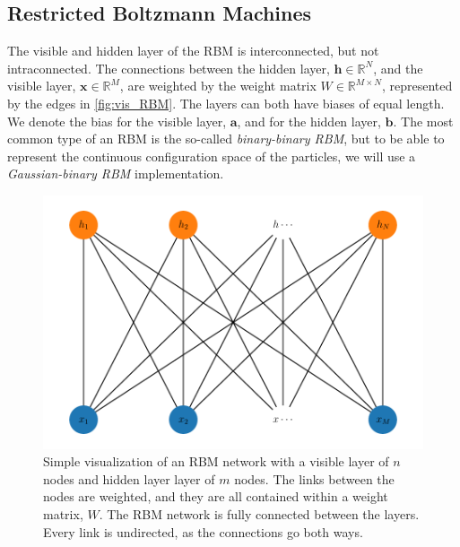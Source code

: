 \subsection{Restricted Boltzmann Machines}
The visible and hidden layer of the RBM is interconnected, but not intraconnected. The connections between the hidden layer, $\bm{h}\in\mathbb{R}^N$, and the visible layer, $\bm{x}\in\mathbb{R}^M$, are weighted by the weight matrix $W\in\mathbb{R}^{M\times N}$, represented by the edges in \autoref{fig:vis_RBM}. The layers can both have biases of equal length. We denote the bias for the visible layer, $\bm{a}$, and for the hidden layer, $\bm{b}$. 
The most common type of an RBM is the so-called \textit{binary-binary RBM}, but to be able to represent the continuous configuration space of the particles, we will use a \textit{Gaussian-binary RBM} implementation. 


\begin{figure}[H]
\begin{center}\includegraphics[scale=0.8]{latex/latex-report/Images/rbm_visualize.pdf}
\end{center}
\caption{Simple visualization of an RBM network with a visible layer of $n$ nodes and hidden layer layer of $m$ nodes. The links between the nodes are weighted, and they are all contained within a weight matrix, $W$. The RBM network is fully connected between the layers. Every link is undirected, as the connections go both ways.}
\label{fig:vis_RBM}
\end{figure}

